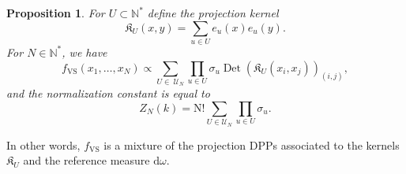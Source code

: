 \documentclass[twoside,11pt]{book}
\newtheorem{proposition}{Proposition}
\numberwithin{theorem}{chapter}
\numberwithin{definition}{chapter}
\numberwithin{proposition}{chapter}
\numberwithin{corollary}{chapter}
\numberwithin{example}{chapter}
\numberwithin{lemma}{chapter}
\numberwithin{assumption}{chapter}
\numberwithin{equation}{chapter}
\numberwithin{figure}{chapter}
\DeclareMathOperator{\Det}{Det}
\DeclareMathOperator{\VS}{\mathrm{VS}}
\DeclareMathOperator*{\KDPP}{\mathfrak{K}}
\DeclareMathOperator{\X}{\mathcal{X}}
\def\UN{\:\mathcal{U}_N}
\begin{document}







\begin{proposition} \label{CVS_prop:VS_decomposition}
For $U \subset \mathbb{N}^{*}$ define the projection kernel
\begin{equation}
\mathfrak{K}_{U}(x,y) = \sum\limits_{u \in U} e_{u}(x)e_{u}(y).
\end{equation}
For $N \in \mathbb{N}^{*}$, we have
\begin{equation}
  \label{CVS_e:mixture}
f_{\VS}(x_{1}, \dots, x_{N}) \propto \sum\limits_{ U \in \UN} \prod\limits_{u \in U} \sigma_{u} \Det (\mathfrak{K}_{U}(x_{i},x_{j}))_{(i,j)},
\end{equation}
and the normalization constant is equal to
\begin{equation}\label{CVS_eq:normalization_constant_VS}
Z_{N}(k) = \mathrm N! \sum\limits_{ U \in \mathcal{U}_{N}} \prod\limits_{u \in U} \sigma_{u}.
\end{equation}
\end{proposition}

In other words, $f_{\VS}$ is a mixture of the projection DPPs associated to the kernels $\mathfrak{K}_{U}$  and the reference measure $\mathrm{d}\omega$.
\end{document}
